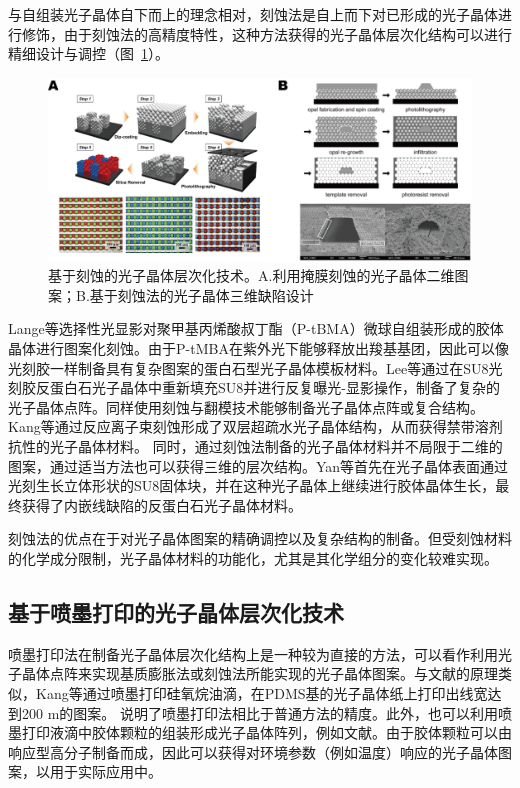 与自组装光子晶体自下而上的理念相对，刻蚀法是自上而下对已形成的光子晶体进行修饰，由于刻蚀法的高精度特性，这种方法获得的光子晶体层次化结构可以进行精细设计与调控（图~\ref{fig:etch-pattern}）。
\begin{figure}[htbp]
	\centering
	\includegraphics[width=0.9\linewidth]{figures/etch-pattern.png}
	\caption{基于刻蚀的光子晶体层次化技术。A.利用掩膜刻蚀的光子晶体二维图案\cite{Lee2006Pixellated}；B.基于刻蚀法的光子晶体三维缺陷设计\cite{Yan2005Line}}
	\label{fig:etch-pattern}
\end{figure}
Lange等选择性光显影对聚甲基丙烯酸叔丁酯（P-tBMA）微球自组装形成的胶体晶体进行图案化刻蚀\cite{Lange2004Photoprocessable}。由于P-tMBA在紫外光下能够释放出羧基基团，因此可以像光刻胶一样制备具有复杂图案的蛋白石型光子晶体模板材料。Lee等通过在SU8光刻胶反蛋白石光子晶体中重新填充SU8并进行反复曝光-显影操作，制备了复杂的光子晶体点阵\cite{Lee2006Pixellated}。同样使用刻蚀与翻模技术能够制备光子晶体点阵或复合结构\cite{Ding2011Patterning,Lee2014Controlled}。
Kang等通过反应离子束刻蚀形成了双层超疏水光子晶体结构，从而获得禁带溶剂抗性的光子晶体材料\cite{Kang2014LiquidImpermeable}。
同时，通过刻蚀法制备的光子晶体材料并不局限于二维的图案，通过适当方法也可以获得三维的层次结构。Yan等首先在光子晶体表面通过光刻生长立体形状的SU8固体块，并在这种光子晶体上继续进行胶体晶体生长，最终获得了内嵌线缺陷的反蛋白石光子晶体材料\cite{Yan2005Line}。

刻蚀法的优点在于对光子晶体图案的精确调控以及复杂结构的制备。但受刻蚀材料的化学成分限制，光子晶体材料的功能化，尤其是其化学组分的变化较难实现。

\subsection{基于喷墨打印的光子晶体层次化技术}
\label{subsec:inkjet-pattern}

喷墨打印法在制备光子晶体层次化结构上是一种较为直接的方法，可以看作利用光子晶体点阵来实现基质膨胀法或刻蚀法所能实现的光子晶体图案。与文献的原理类似，Kang等通过喷墨打印硅氧烷油滴，在PDMS基的光子晶体纸上打印出线宽达到200 \text{$\mu$}m的图案\cite{Kang2011High}。
说明了喷墨打印法相比于普通方法的精度。此外，也可以利用喷墨打印液滴中胶体颗粒的组装形成光子晶体阵列，例如文献。由于胶体颗粒可以由响应型高分子制备而成，因此可以获得对环境参数（例如温度）响应的光子晶体图案\cite{Wang2012Inkjet}，以用于实际应用中。

